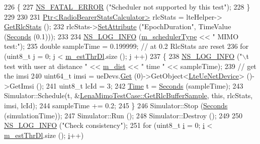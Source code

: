 \begin{DoxyCode}
226     \{
227       \hyperlink{group__fatal_ga5131d5e3f75d7d4cbfd706ac456fdc85}{NS\_FATAL\_ERROR} (\textcolor{stringliteral}{"Scheduler not supported by this test"});
228     \}
229     
230   
231   \hyperlink{classns3_1_1Ptr}{Ptr<RadioBearerStatsCalculator>} rlcStats = lteHelper->
      \hyperlink{classns3_1_1LteHelper_a6eb438ccf69642e3863adea4991fa2ca}{GetRlcStats} ();
232   rlcStats->\hyperlink{classns3_1_1ObjectBase_ac60245d3ea4123bbc9b1d391f1f6592f}{SetAttribute} (\textcolor{stringliteral}{"EpochDuration"}, TimeValue (\hyperlink{group__timecivil_ga33c34b816f8ff6628e33d5c8e9713b9e}{Seconds} (0.1)));
233 
234   \hyperlink{group__logging_gafbd73ee2cf9f26b319f49086d8e860fb}{NS\_LOG\_INFO} (\hyperlink{classLenaMimoTestCase_a462839a0431fbfbc7650a5b1bfe1004c}{m\_schedulerType} << \textcolor{stringliteral}{" MIMO test:"});
235   \textcolor{keywordtype}{double} sampleTime = 0.199999; \textcolor{comment}{// at 0.2 RlcStats are reset}
236   \textcolor{keywordflow}{for} (uint8\_t j = 0; j < \hyperlink{classLenaMimoTestCase_a9c7b83d2420ebbd235f35ad242602cb3}{m\_estThrDl}.size (); j ++)
237     \{
238       \hyperlink{group__logging_gafbd73ee2cf9f26b319f49086d8e860fb}{NS\_LOG\_INFO} (\textcolor{stringliteral}{"\(\backslash\)t test with user at distance "} << \hyperlink{classLenaMimoTestCase_ae63d46254a08c9e2b064d6c4855d5a77}{m\_dist} << \textcolor{stringliteral}{" time "} << sampleTime);
239       \textcolor{comment}{// get the imsi}
240       uint64\_t imsi = ueDevs.\hyperlink{classns3_1_1NetDeviceContainer_a677d62594b5c9d2dea155cc5045f4d0b}{Get} (0)->GetObject<\hyperlink{classns3_1_1LteUeNetDevice}{LteUeNetDevice}> ()->GetImsi ();
241       uint8\_t lcId = 3;
242       \hyperlink{classns3_1_1Time}{Time} t = \hyperlink{group__timecivil_ga33c34b816f8ff6628e33d5c8e9713b9e}{Seconds} (sampleTime);
243       Simulator::Schedule(t, &\hyperlink{classLenaMimoTestCase_a43eedcc3fd861f523d97d7c04ca2b9f8}{LenaMimoTestCase::GetRlcBufferSample}, \textcolor{keyword}{
      this}, rlcStats, imsi, lcId);
244       sampleTime += 0.2;
245     \}
246   Simulator::Stop (\hyperlink{group__timecivil_ga33c34b816f8ff6628e33d5c8e9713b9e}{Seconds} (simulationTime));
247   Simulator::Run ();
248   Simulator::Destroy ();
249 
250   \hyperlink{group__logging_gafbd73ee2cf9f26b319f49086d8e860fb}{NS\_LOG\_INFO} (\textcolor{stringliteral}{"Check consistency"});
251     \textcolor{keywordflow}{for} (uint8\_t \hyperlink{bernuolliDistribution_8m_a6f6ccfcf58b31cb6412107d9d5281426}{i} = 0; \hyperlink{bernuolliDistribution_8m_a6f6ccfcf58b31cb6412107d9d5281426}{i} < \hyperlink{classLenaMimoTestCase_a9c7b83d2420ebbd235f35ad242602cb3}{m\_estThrDl}.size (); \hyperlink{bernuolliDistribution_8m_a6f6ccfcf58b31cb6412107d9d5281426}{i}++)

\end{DoxyCode}
